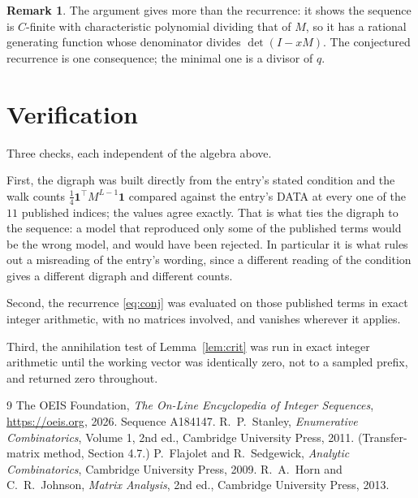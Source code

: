 \documentclass[11pt,a4paper]{article}
\theoremstyle{plain}
\theoremstyle{definition}
\newtheorem{remark}[theorem]{Remark}
\begin{document}
\begin{remark}
The argument gives more than the recurrence: it shows the sequence is $C$-finite with
characteristic polynomial dividing that of $M$, so it has a rational generating function
whose denominator divides $\det(I-xM)$. The conjectured recurrence is one consequence; the
minimal one is a divisor of $q$.
\end{remark}

\section{Verification}

Three checks, each independent of the algebra above.

First, the digraph was built directly from the entry's stated condition and the walk counts
$\tfrac1{4}\mathbf{1}^{\!\top}M^{L-1}\mathbf{1}$ compared against the entry's DATA at
every one of the $11$ published indices; the values agree exactly. That is what ties
the digraph to the sequence: a model that reproduced only some of the published terms would
be the wrong model, and would have been rejected. In particular it is what rules out a
misreading of the entry's wording, since a different reading of the condition gives a
different digraph and different counts.

Second, the recurrence \eqref{eq:conj} was evaluated on those published terms in exact
integer arithmetic, with no matrices involved, and vanishes wherever it applies.

Third, the annihilation test of Lemma~\ref{lem:crit} was run in exact integer arithmetic
until the working vector was identically zero, not to a sampled prefix, and returned zero
throughout.

\begin{thebibliography}{9}
 The OEIS Foundation, \emph{The On-Line Encyclopedia of Integer
Sequences}, \url{https://oeis.org}, 2026. Sequence A184147.
 R.~P.~Stanley, \emph{Enumerative Combinatorics}, Volume 1, 2nd ed.,
Cambridge University Press, 2011. (Transfer-matrix method, Section 4.7.)
 P.~Flajolet and R.~Sedgewick, \emph{Analytic Combinatorics}, Cambridge
University Press, 2009.
 R.~A.~Horn and C.~R.~Johnson, \emph{Matrix Analysis}, 2nd ed., Cambridge
University Press, 2013.
\end{thebibliography}
\end{document}
